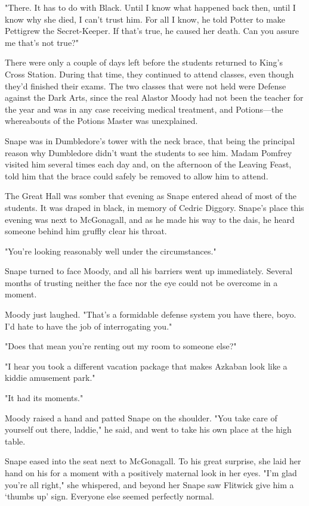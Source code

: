 "There. It has to do with Black. Until I know what happened back then, until I know why she died, I can't trust him. For all I know, he told Potter to make Pettigrew the Secret-Keeper. If that's true, he caused her death. Can you assure me that's not true?"

\sbreak

There were only a couple of days left before the students returned to King's Cross Station. During that time, they continued to attend classes, even though they'd finished their exams. The two classes that were not held were Defense against the Dark Arts, since the real Alastor Moody had not been the teacher for the year and was in any case receiving medical treatment, and Potions—the whereabouts of the Potions Master was unexplained.

Snape was in Dumbledore's tower with the neck brace, that being the principal reason why Dumbledore didn't want the students to see him. Madam Pomfrey visited him several times each day and, on the afternoon of the Leaving Feast, told him that the brace could safely be removed to allow him to attend.

The Great Hall was somber that evening as Snape entered ahead of most of the students. It was draped in black, in memory of Cedric Diggory. Snape's place this evening was next to McGonagall, and as he made his way to the dais, he heard someone behind him gruffly clear his throat.

"You're looking reasonably well under the circumstances."

Snape turned to face Moody, and all his barriers went up immediately. Several months of trusting neither the face nor the eye could not be overcome in a moment.

Moody just laughed. "That's a formidable defense system you have there, boyo. I'd hate to have the job of interrogating you."

"Does that mean you're renting out my room to someone else?"

"I hear you took a different vacation package that makes Azkaban look like a kiddie amusement park."

"It had its moments."

Moody raised a hand and patted Snape on the shoulder. "You take care of yourself out there, laddie," he said, and went to take his own place at the high table.

Snape eased into the seat next to McGonagall. To his great surprise, she laid her hand on his for a moment with a positively maternal look in her eyes. "I'm glad you're all right," she whispered, and beyond her Snape saw Flitwick give him a `thumbs up' sign. Everyone else seemed perfectly normal.

